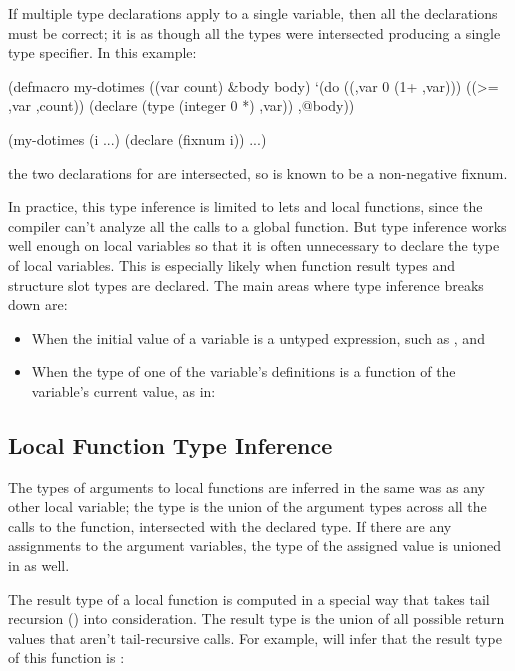 If multiple type declarations apply to a single variable, then all the
declarations must be correct; it is as though all the types were intersected
producing a single  type specifier.  In this example:
\begin{example}
(defmacro my-dotimes ((var count) &body body)
  `(do ((,var 0 (1+ ,var)))
       ((>= ,var ,count))
     (declare (type (integer 0 *) ,var))
     ,@body))

(my-dotimes (i ...)
  (declare (fixnum i))
  ...)
\end{example}
the two declarations for  are intersected, so  is
known to be a non-negative fixnum.

In practice, this type inference is limited to lets and local
functions, since the compiler can't analyze all the calls to a global
function.  But type inference works well enough on local variables so
that it is often unnecessary to declare the type of local variables.
This is especially likely when function result types and structure
slot types are declared.  The main areas where type inference breaks
down are:
\begin{itemize}
  
\item When the initial value of a variable is a untyped expression,
  such as , and
  
\item When the type of one of the variable's definitions is a function
  of the variable's current value, as in: 
\end{itemize}


\subsection{Local Function Type Inference}

The types of arguments to local functions are inferred in the same was
as any other local variable; the type is the union of the argument
types across all the calls to the function, intersected with the
declared type.  If there are any assignments to the argument
variables, the type of the assigned value is unioned in as well.

The result type of a local function is computed in a special way that
takes tail recursion () into consideration.
The result type is the union of all possible return values that aren't
tail-recursive calls.  For example, \python{} will infer that the
result type of this function is :


